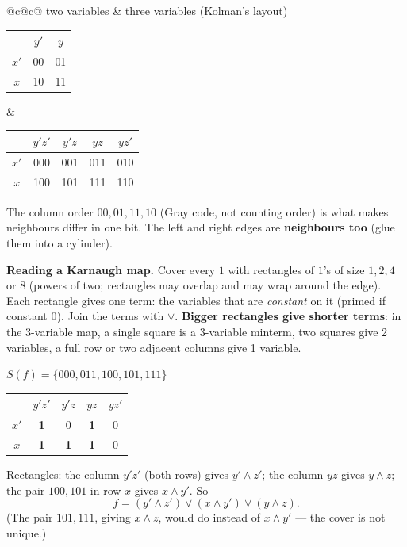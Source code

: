 \documentclass{fkt-notes}
\theoremstyle{definition}
\begin{document}
\begin{center}
  \small
  \begin{tabular}{@{}c@{\qquad\qquad}c@{}}
    two variables & three variables (Kolman's layout) \\[2pt]
    \begin{tabular}{c|cc}
           & $y'$ & $y$ \\\hline
      $x'$ & 00   & 01  \\
      $x$  & 10   & 11
    \end{tabular}
                  &
    \begin{tabular}{c|cccc}
           & $y'z'$ & $y'z$ & $yz$ & $yz'$ \\\hline
      $x'$ & 000    & 001   & 011  & 010   \\
      $x$  & 100    & 101   & 111  & 110
    \end{tabular}
  \end{tabular}
\end{center}
The column order $00,01,11,10$ (Gray code, not counting order) is what
makes neighbours differ in one bit. The left and right edges are
\textbf{neighbours too} (glue them into a cylinder).

\begin{rulepar}
  \textbf{Reading a Karnaugh map.} Cover every $1$ with rectangles of
  $1$'s of size $1,2,4$ or $8$ (powers of two; rectangles may overlap and
  may wrap around the edge). Each rectangle gives one term: the
  variables that are \emph{constant} on it (primed if constant $0$).
  Join the terms with $\vee$. \textbf{Bigger rectangles give shorter
    terms}: in the 3-variable map, a single square is a 3-variable
  minterm, two squares give 2 variables, a full row or two adjacent
  columns give 1 variable.
\end{rulepar}

\begin{example}[6.6 Ex.~6]
  \leavevmode\par\noindent
  \begin{minipage}[c]{0.45\textwidth}
    \centering\small
    $S(f)=\{000,011,100,101,111\}$\\[4pt]
    \begin{tabular}{c|cccc}
           & $y'z'$     & $y'z$      & $yz$       & $yz'$ \\\hline
      $x'$ & \textbf{1} & 0          & \textbf{1} & 0     \\
      $x$  & \textbf{1} & \textbf{1} & \textbf{1} & 0
    \end{tabular}
  \end{minipage}\hfill
  \begin{minipage}[c]{0.52\textwidth}
    Rectangles: the column $y'z'$ (both rows) gives $y'\wedge z'$; the
    column $yz$ gives $y\wedge z$; the pair $100,101$ in row $x$ gives
    $x\wedge y'$. So
    \[
      f=(y'\wedge z')\vee(x\wedge y')\vee(y\wedge z).
    \]
    (The pair $101,111$, giving $x\wedge z$, would do instead of
    $x\wedge y'$ --- the cover is not unique.)
  \end{minipage}
\end{example}
\end{document}
